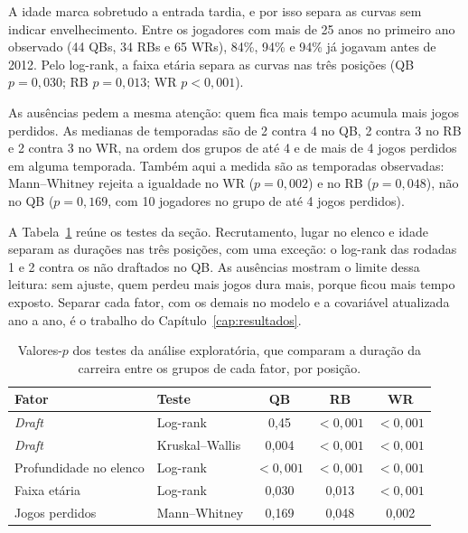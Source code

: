 A idade marca sobretudo a entrada tardia, e por isso separa as curvas sem indicar envelhecimento. Entre os jogadores com mais de 25 anos no primeiro ano observado (44 QBs, 34 RBs e 65 WRs), 84\%, 94\% e 94\% já jogavam antes de 2012. Pelo log-rank, a faixa etária separa as curvas nas três posições (QB $p=0{,}030$; RB $p=0{,}013$; WR $p<0{,}001$).

As ausências pedem a mesma atenção: quem fica mais tempo acumula mais jogos perdidos. As medianas de temporadas são de 2 contra 4 no QB, 2 contra 3 no RB e 2 contra 3 no WR, na ordem dos grupos de até 4 e de mais de 4 jogos perdidos em alguma temporada. Também aqui a medida são as temporadas observadas: Mann--Whitney rejeita a igualdade no WR ($p=0{,}002$) e no RB ($p=0{,}048$), não no QB ($p=0{,}169$, com 10 jogadores no grupo de até 4 jogos perdidos).

A Tabela~\ref{tab:eda_testes} reúne os testes da seção. Recrutamento, lugar no elenco e idade separam as durações nas três posições, com uma exceção: o log-rank das rodadas 1 e 2 contra os não draftados no QB. As ausências mostram o limite dessa leitura: sem ajuste, quem perdeu mais jogos dura mais, porque ficou mais tempo exposto. Separar cada fator, com os demais no modelo e a covariável atualizada ano a ano, é o trabalho do Capítulo~\ref{cap:resultados}.

\begin{table}[H]
\centering
\caption{Valores-$p$ dos testes da análise exploratória, que comparam a duração da carreira entre os grupos de cada fator, por posição.}
\label{tab:eda_testes}
\thesistablesetup
\begin{tabular*}{\textwidth}{@{\extracolsep{\fill}}llccc@{}}
\toprule
\textbf{Fator} & \textbf{Teste} & \textbf{QB} & \textbf{RB} & \textbf{WR} \\
\midrule
\textit{Draft} & Log-rank & 0,45 & $<0{,}001$ & $<0{,}001$ \\
\textit{Draft} & Kruskal--Wallis & 0,004 & $<0{,}001$ & $<0{,}001$ \\
Profundidade no elenco & Log-rank & $<0{,}001$ & $<0{,}001$ & $<0{,}001$ \\
Faixa etária & Log-rank & 0,030 & 0,013 & $<0{,}001$ \\
Jogos perdidos & Mann--Whitney & 0,169 & 0,048 & 0,002 \\
\bottomrule
\end{tabular*}
\end{table}

